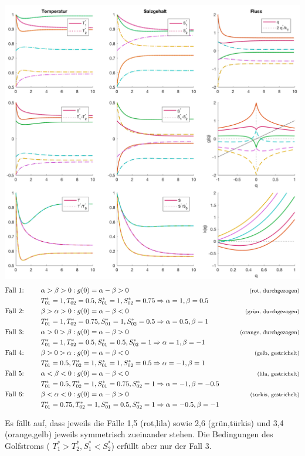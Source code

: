 \documentclass[10pt,a4paper]{article}
\begin{document}
	\begin{center}
	\includegraphics[width=14cm]{Diagramme/Fallstudie.png}
	\begin{align*}
		\textrm{Fall 1: } &\qquad \alpha > \beta > 0: g(0) = \alpha - \beta > 0 &\qquad \footnotesize{\textrm{(rot, durchgezogen)}} \\
		&\qquad T^*_{01} = 1, T^*_{02} = 0.5, S^*_{01} = 1, S^*_{02} = 0.75 \Rightarrow \alpha = 1, \beta = 0.5 \\
		\textrm{Fall 2: } &\qquad \beta > \alpha > 0: g(0) = \alpha - \beta < 0 &\qquad \footnotesize{\textrm{(grün, durchgezogen)}} \\
		&\qquad T^*_{01} = 1, T^*_{02} = 0.75, S^*_{01} = 1, S^*_{02} = 0.5 \Rightarrow \alpha = 0.5, \beta = 1 \\
		\textrm{Fall 3: } &\qquad \alpha > 0 > \beta: g(0) = \alpha - \beta > 0 &\qquad \footnotesize{\textrm{(orange, durchgezogen)}} \\
		&\qquad T^*_{01} = 1, T^*_{02} = 0.5, S^*_{01} = 0.5, S^*_{02} = 1 \Rightarrow \alpha = 1, \beta = -1 \\
		\textrm{Fall 4: } &\qquad \beta > 0 > \alpha: g(0) = \alpha - \beta < 0 &\qquad \footnotesize{\textrm{(gelb, gestrichelt)}} \\
		&\qquad T^*_{01} = 0.5, T^*_{02} = 1, S^*_{01} = 1, S^*_{02} = 0.5 \Rightarrow \alpha = -1, \beta = 1 \\
		\textrm{Fall 5: } &\qquad \alpha < \beta < 0: g(0) = \alpha - \beta < 0 &\qquad \footnotesize{\textrm{(lila, gestrichelt)}} \\
		&\qquad T^*_{01} = 0.5, T^*_{02} = 1, S^*_{01} = 0.75, S^*_{02} = 1 \Rightarrow \alpha = -1, \beta = -0.5 \\
		\textrm{Fall 6: } &\qquad \beta < \alpha < 0: g(0) = \alpha - \beta > 0 &\qquad \footnotesize{\textrm{(türkis, gestrichelt)}} \\
		&\qquad T^*_{01} = 0.75, T^*_{02} = 1, S^*_{01} = 0.5, S^*_{02} = 1 \Rightarrow \alpha = -0.5, \beta = -1
	\end{align*}
	\end{center}		
	
	Es fällt auf, dass jeweils die Fälle 1,5 (rot,lila) sowie 2,6 (grün,türkis) und 3,4 (orange,gelb) jeweils symmetrisch zueinander stehen. Die Bedingungen des Golfstroms  ( \(T^*_1 > T^*_2, S^*_1 < S^*_2\)) erfüllt aber nur der Fall 3.
\end{document}
